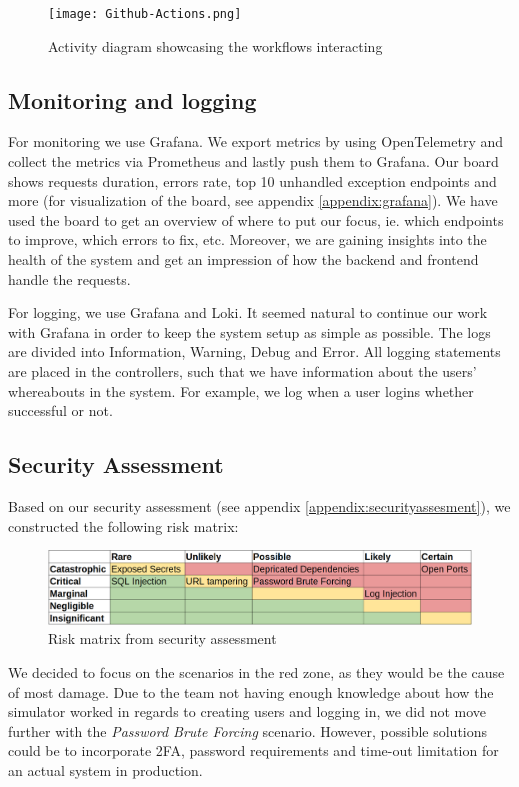 \begin{figure}[H]
    \centering
    \texttt{[image: Github-Actions.png]}
    \caption{Activity diagram showcasing the workflows interacting }
    \label{fig:workflows}
\end{figure}

\subsection{Monitoring and logging}
For monitoring we use Grafana. We export metrics by using OpenTelemetry and collect the metrics via Prometheus and lastly push them to Grafana. Our board shows requests duration, errors rate, top 10 unhandled exception endpoints and more (for visualization of the board, see appendix \ref{appendix:grafana}). We have used the board to get an overview of where to put our focus, ie. which endpoints to improve, which errors to fix, etc. Moreover, we are gaining insights into the health of the system and get an impression of how the backend and frontend handle the requests.

For logging, we use Grafana and Loki. It seemed natural to continue our work with Grafana in order to keep the system setup as simple as possible. The logs are divided into Information, Warning, Debug and Error. All logging statements are placed in the controllers, such that we have information about the users' whereabouts in the system. For example, we log when a user logins whether successful or not.

\subsection{Security Assessment}
Based on our security assessment (see appendix \ref{appendix:securityassesment}), we constructed the following risk matrix:
\begin{figure}[H]
    \centering
    \includegraphics[width=1\linewidth]{images/risk-matrix.png}
    \caption{Risk matrix from security assessment}
    \label{fig:enter-label}
\end{figure}
We decided to focus on the scenarios in the red zone, as they would be the cause of most damage. Due to the team not having enough knowledge about how the simulator worked in regards to creating users and logging in, we did not move further with the \textit{Password Brute Forcing} scenario. However, possible solutions could be to incorporate 2FA, password requirements and time-out limitation for an actual system in production.

